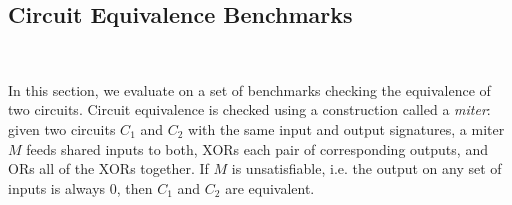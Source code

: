 \subsection{Circuit Equivalence Benchmarks}~\label{sec:eval:circuit}






In this section, we evaluate on a set of benchmarks checking the equivalence of
two circuits. Circuit equivalence is checked using a construction called a
\emph{miter}: given two circuits $C_1$ and $C_2$ with the same input and output
signatures, a miter $M$ feeds shared inputs to both, XORs each pair of
corresponding outputs, and ORs all of the XORs together. If $M$ is
unsatisfiable, i.e. the output on any set of inputs is always $0$, then $C_1$
and $C_2$ are equivalent.

